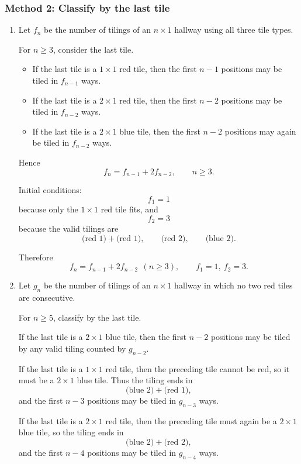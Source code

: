 \documentclass[12pt]{article}
\begin{document}
\subsubsection*{Method 2: Classify by the last tile}
\begin{enumerate}[label=(\alph*)]
\item Let \(f_n\) be the number of tilings of an \(n\times 1\) hallway using all three tile types.

For \(n\ge 3\), consider the last tile.
\begin{itemize}[leftmargin=*]
  \item If the last tile is a \(1\times 1\) red tile, then the first \(n-1\) positions may be tiled in \(f_{n-1}\) ways.
  \item If the last tile is a \(2\times 1\) red tile, then the first \(n-2\) positions may be tiled in \(f_{n-2}\) ways.
  \item If the last tile is a \(2\times 1\) blue tile, then the first \(n-2\) positions may again be tiled in \(f_{n-2}\) ways.
\end{itemize}
Hence
\[
f_n=f_{n-1}+2f_{n-2}, \qquad n\ge 3.
\]

Initial conditions:
\[
f_1=1
\]
because only the \(1\times 1\) red tile fits, and
\[
f_2=3
\]
because the valid tilings are
\[
\text{(red 1)}+\text{(red 1)}, \qquad \text{(red 2)}, \qquad \text{(blue 2)}.
\]

Therefore
\[
\boxed{f_n=f_{n-1}+2f_{n-2}\ \ (n\ge 3), \qquad f_1=1,\ f_2=3.}
\]

\item Let \(g_n\) be the number of tilings of an \(n\times 1\) hallway in which no two red tiles are consecutive.

For \(n\ge 5\), classify by the last tile.

\medskip
\noindent
If the last tile is a \(2\times 1\) blue tile, then the first \(n-2\) positions may be tiled by any valid tiling counted by \(g_{n-2}\).

\medskip
\noindent
If the last tile is a \(1\times 1\) red tile, then the preceding tile cannot be red, so it must be a \(2\times 1\) blue tile. Thus the tiling ends in
\[
\text{(blue 2)}+\text{(red 1)},
\]
and the first \(n-3\) positions may be tiled in \(g_{n-3}\) ways.

\medskip
\noindent
If the last tile is a \(2\times 1\) red tile, then the preceding tile must again be a \(2\times 1\) blue tile, so the tiling ends in
\[
\text{(blue 2)}+\text{(red 2)},
\]
and the first \(n-4\) positions may be tiled in \(g_{n-4}\) ways.


\end{enumerate}
\end{document}
